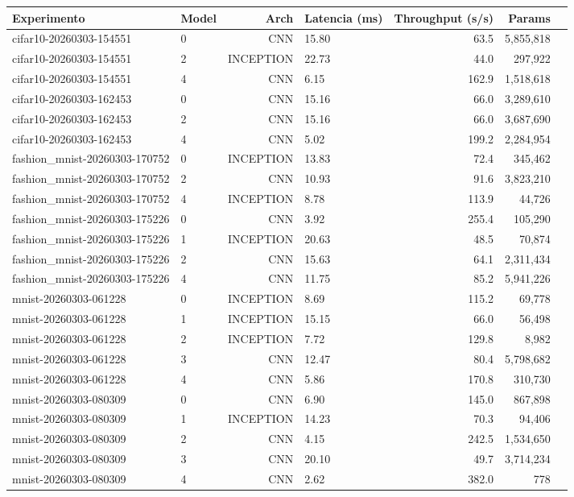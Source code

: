 \begin{tabular}{llrlrrr}
\toprule
Experimento & Model & Arch & Latencia (ms) & Throughput (s/s) & Params \\
\midrule
cifar10-20260303-154551 & 0 & CNN & 15.80 & 63.5 & 5,855,818 \\
cifar10-20260303-154551 & 2 & INCEPTION & 22.73 & 44.0 & 297,922 \\
cifar10-20260303-154551 & 4 & CNN & 6.15 & 162.9 & 1,518,618 \\
cifar10-20260303-162453 & 0 & CNN & 15.16 & 66.0 & 3,289,610 \\
cifar10-20260303-162453 & 2 & CNN & 15.16 & 66.0 & 3,687,690 \\
cifar10-20260303-162453 & 4 & CNN & 5.02 & 199.2 & 2,284,954 \\
fashion_mnist-20260303-170752 & 0 & INCEPTION & 13.83 & 72.4 & 345,462 \\
fashion_mnist-20260303-170752 & 2 & CNN & 10.93 & 91.6 & 3,823,210 \\
fashion_mnist-20260303-170752 & 4 & INCEPTION & 8.78 & 113.9 & 44,726 \\
fashion_mnist-20260303-175226 & 0 & CNN & 3.92 & 255.4 & 105,290 \\
fashion_mnist-20260303-175226 & 1 & INCEPTION & 20.63 & 48.5 & 70,874 \\
fashion_mnist-20260303-175226 & 2 & CNN & 15.63 & 64.1 & 2,311,434 \\
fashion_mnist-20260303-175226 & 4 & CNN & 11.75 & 85.2 & 5,941,226 \\
mnist-20260303-061228 & 0 & INCEPTION & 8.69 & 115.2 & 69,778 \\
mnist-20260303-061228 & 1 & INCEPTION & 15.15 & 66.0 & 56,498 \\
mnist-20260303-061228 & 2 & INCEPTION & 7.72 & 129.8 & 8,982 \\
mnist-20260303-061228 & 3 & CNN & 12.47 & 80.4 & 5,798,682 \\
mnist-20260303-061228 & 4 & CNN & 5.86 & 170.8 & 310,730 \\
mnist-20260303-080309 & 0 & CNN & 6.90 & 145.0 & 867,898 \\
mnist-20260303-080309 & 1 & INCEPTION & 14.23 & 70.3 & 94,406 \\
mnist-20260303-080309 & 2 & CNN & 4.15 & 242.5 & 1,534,650 \\
mnist-20260303-080309 & 3 & CNN & 20.10 & 49.7 & 3,714,234 \\
mnist-20260303-080309 & 4 & CNN & 2.62 & 382.0 & 778 \\

\end{tabular}
